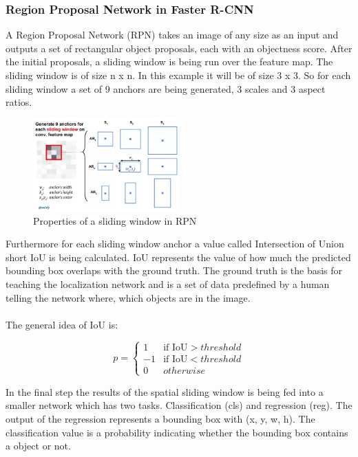 \subsubsection{Region Proposal Network in Faster R-CNN}
A Region Proposal Network (RPN) takes an image of any size as an input and outputs a set of rectangular object proposals, each with an
objectness score. After the initial proposals, a sliding window is being run over the feature map. The sliding
window is of size n x n. In this example it will be of size 3 x 3. So for each sliding window a set of 9 anchors are being generated, 3
scales and 3 aspect ratios.\cite{fasterrcnn}
\begin{figure}[!hbt]
    \caption{Properties of a sliding window in RPN}
    \begin{center}
        \includegraphics[width=0.5\textwidth]{images/object_detection/rpn_anchors.png}
    \end{center}
\end{figure}
Furthermore for each sliding window anchor a value called Intersection of Union short IoU is being calculated. IoU represents the value of how
much the predicted bounding box overlaps with the ground truth. The ground truth is the basis for teaching the localization network and is a
set of data predefined by a human telling the network where, which objects are in the image.\cite{fasterrcnn} \\ \\
The general idea of IoU is:
\begin{center}
    \begin{equation*}
        p =
        \begin{cases} 
            1 & \text{if IoU} > threshold \\
            -1 & \text{if IoU} < threshold \\
            0 & otherwise
        \end{cases}
    \end{equation*}
\end{center}
In the final step the results of the spatial sliding window is being fed into a smaller network which has two tasks. Classification (cls)
and regression (reg). The output of the regression represents a bounding box with (x, y, w, h). The classification value is a probability
indicating whether the bounding box contains a object or not.\cite{fasterrcnn}

